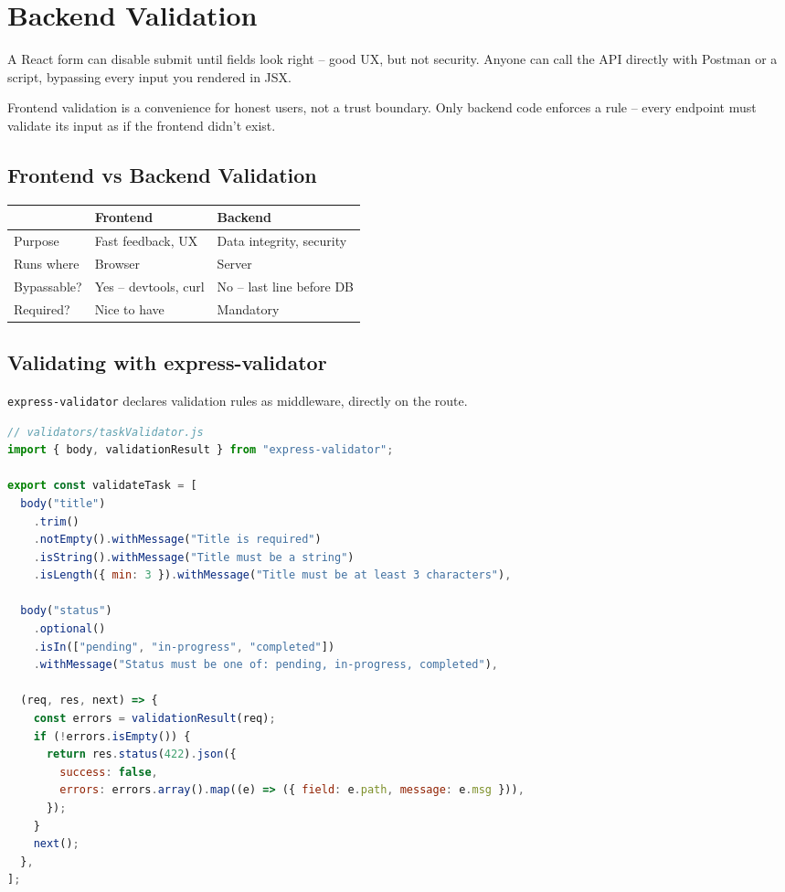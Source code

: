 \chapter{Backend Validation}

A React form can disable submit until fields look right -- good UX, but not security. Anyone can call the API directly with Postman or a script, bypassing every input you rendered in JSX.

\begin{warnbox}[WARNING]
Frontend validation is a convenience for honest users, not a trust boundary. Only backend code enforces a rule -- every endpoint must validate its input as if the frontend didn't exist.
\end{warnbox}

\section{Frontend vs Backend Validation}

\begin{center}
\begin{tabularx}{\textwidth}{lXX}
\toprule
\textbf{} & \textbf{Frontend} & \textbf{Backend} \\
\midrule
Purpose & Fast feedback, UX & Data integrity, security \\
Runs where & Browser & Server \\
Bypassable? & Yes -- devtools, curl & No -- last line before DB \\
Required? & Nice to have & Mandatory \\
\bottomrule
\end{tabularx}
\end{center}

\section{Validating with express-validator}

\texttt{express-validator} declares validation rules as middleware, directly on the route.

\begin{lstlisting}[language=JavaScript]
// validators/taskValidator.js
import { body, validationResult } from "express-validator";

export const validateTask = [
  body("title")
    .trim()
    .notEmpty().withMessage("Title is required")
    .isString().withMessage("Title must be a string")
    .isLength({ min: 3 }).withMessage("Title must be at least 3 characters"),

  body("status")
    .optional()
    .isIn(["pending", "in-progress", "completed"])
    .withMessage("Status must be one of: pending, in-progress, completed"),

  (req, res, next) => {
    const errors = validationResult(req);
    if (!errors.isEmpty()) {
      return res.status(422).json({
        success: false,
        errors: errors.array().map((e) => ({ field: e.path, message: e.msg })),
      });
    }
    next();
  },
];
\end{lstlisting}

